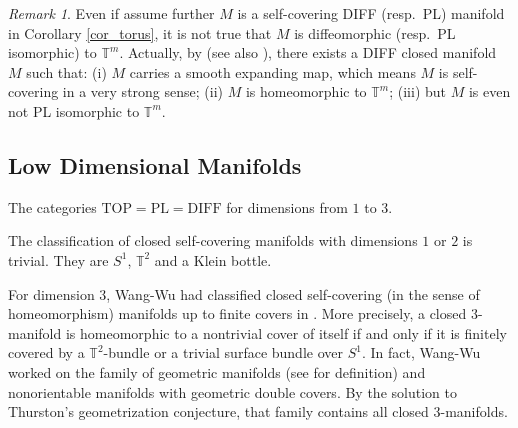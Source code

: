 \documentclass[12pt]{amsart}
\theoremstyle{plain}
\theoremstyle{definition}
\theoremstyle{question}
\theoremstyle{remark}
\newtheorem{remark}[theorem]{Remark}
\theoremstyle{assumption}
\numberwithin{equation}{section}
\theoremstyle{bigthm}
\begin{document}
\begin{remark}
Even if assume further $M$ is a self-covering DIFF (resp.~PL) manifold in Corollary \ref{cor_torus}, it is not true that $M$ is diffeomorphic (resp.~PL isomorphic) to $\mathbb{T}^{m}$. Actually, by \cite{Farrell_Gogolev} (see also \cite{Farrell_Jones78}), there exists a DIFF closed manifold $M$ such that: (i) $M$ carries a smooth expanding map, which means $M$ is self-covering in a very strong sense; (ii) $M$ is homeomorphic to $\mathbb{T}^{m}$; (iii) but $M$ is even not PL isomorphic to $\mathbb{T}^{m}$.
\end{remark}

\subsection{Low Dimensional Manifolds}
The categories $\mathrm{TOP} = \mathrm{PL} = \mathrm{DIFF}$ for dimensions from $1$ to $3$.

The classification of closed self-covering manifolds with dimensions $1$ or $2$ is trivial. They are $S^{1}$, $\mathbb{T}^{2}$ and a Klein bottle.

For dimension $3$, Wang-Wu had classified closed self-covering (in the sense of homeomorphism) manifolds up to finite covers in \cite[Theorem~8.6]{Wang_Wu}. More precisely, a closed $3$-manifold is homeomorphic to a nontrivial cover of itself if and only if it is finitely covered by a $\mathbb{T}^{2}$-bundle or a trivial surface bundle over $S^{1}$. In fact, Wang-Wu worked on the family of geometric manifolds (see \cite[p.~203]{Wang_Wu} for definition) and nonorientable manifolds with geometric double covers. By the solution to Thurston's geometrization conjecture, that family contains all closed $3$-manifolds.
\end{document}
